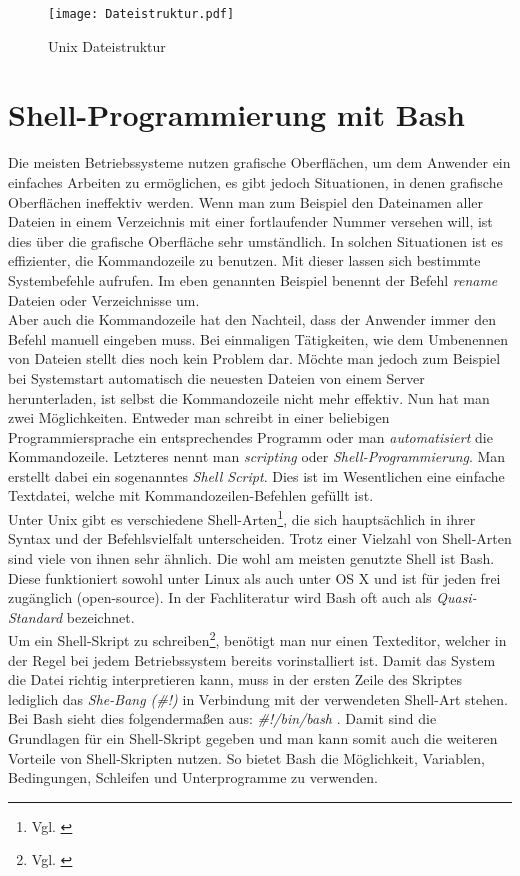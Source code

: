\begin{figure}[H]
    \centering
    \texttt{[image: Dateistruktur.pdf]}
    \vspace{-20pt}
    \caption{Unix Dateistruktur}
    \vspace{-10pt}
  \label{img:Dateistruktur}
\end{figure}



\section{Shell-Programmierung mit Bash}
Die meisten Betriebssysteme nutzen grafische Oberflächen, um dem Anwender ein einfaches Arbeiten zu ermöglichen, es gibt jedoch Situationen, in denen grafische Oberflächen ineffektiv werden. Wenn man zum Beispiel den Dateinamen aller Dateien in einem Verzeichnis mit einer fortlaufender Nummer versehen will, ist dies über die grafische Oberfläche sehr umständlich. In solchen Situationen ist es effizienter, die Kommandozeile zu benutzen. Mit dieser lassen sich bestimmte Systembefehle aufrufen. Im eben genannten Beispiel benennt der Befehl \textit{rename} Dateien oder Verzeichnisse um.\\ Aber auch die Kommandozeile hat den Nachteil, dass der Anwender immer den Befehl manuell eingeben muss. Bei einmaligen Tätigkeiten, wie dem Umbenennen von Dateien stellt dies noch kein Problem dar. Möchte man jedoch zum Beispiel bei Systemstart automatisch die neuesten Dateien von einem Server herunterladen, ist selbst die Kommandozeile nicht mehr effektiv. Nun hat man zwei Möglichkeiten. Entweder man schreibt in einer beliebigen Programmiersprache ein entsprechendes Programm oder man \textit{automatisiert} die Kommandozeile. Letzteres nennt man \textit{scripting} oder \textit{Shell-Programmierung}. Man erstellt dabei ein sogenanntes \textit{Shell Script}. Dies ist im Wesentlichen eine einfache Textdatei, welche mit Kommandozeilen-Befehlen gefüllt ist.\\
Unter Unix gibt es verschiedene Shell-Arten\footnote{Vgl. \cite[Seite 4]{burtch_linux_2004}}, die sich hauptsächlich in ihrer Syntax und der Befehlsvielfalt unterscheiden. Trotz einer Vielzahl von Shell-Arten sind viele von ihnen sehr ähnlich. Die wohl am meisten genutzte Shell ist \acs{Bash}. Diese funktioniert sowohl unter Linux als auch unter OS X und ist für jeden frei zugänglich (open-source). In der Fachliteratur wird \acs{Bash} oft auch als \textit{Quasi-Standard} bezeichnet.\\
Um ein Shell-Skript zu schreiben\footnote{Vgl. \cite[Seite 23]{shell-programmierung}}, benötigt man nur einen Texteditor, welcher in der Regel bei jedem Betriebssystem bereits vorinstalliert ist. Damit das System die Datei richtig interpretieren kann, muss in der ersten Zeile des Skriptes lediglich das  \textit{She-Bang (\#!)} in Verbindung mit der verwendeten Shell-Art stehen. Bei Bash sieht dies folgendermaßen aus:\textit{ \#!/bin/bash }. Damit sind die Grundlagen für ein Shell-Skript gegeben und man kann somit auch die weiteren Vorteile von Shell-Skripten nutzen. So bietet \acs{Bash} die Möglichkeit, Variablen, Bedingungen, Schleifen und Unterprogramme zu verwenden.\\
